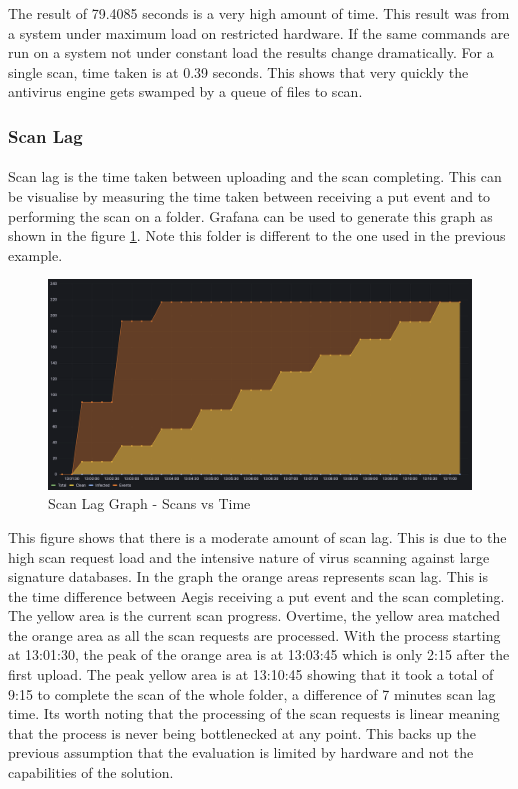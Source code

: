 \documentclass[12pt, conference, final, a4paper, onecolumn, compsoc]{IEEEtran}
\begin{document}
The result of 79.4085 seconds is a very high amount of time. This result was from a system under maximum load on restricted hardware. If the same commands are run on a system not under constant load the results change dramatically. For a single scan, time taken is at 0.39 seconds. This shows that very quickly the antivirus engine gets swamped by a queue of files to scan.

\subsubsection*{Scan Lag}
\paragraph{}
Scan lag is the time taken between uploading and the scan completing. This can
be visualise by measuring the time taken between receiving a put event and to
performing the scan on a folder. Grafana can be used to generate this graph as shown in the
figure \ref{fig:scan-lag}. Note this folder is different to the one used in the
previous example.

\begin{figure}[H]
  \centering \includegraphics[scale=0.31]{images/scan-lag.png}
  \caption{Scan Lag Graph - Scans vs Time}
  \label{fig:scan-lag}
\end{figure}

This figure shows that there is a moderate amount of scan lag. This is due to
the high scan request load and the intensive nature of virus scanning against
large signature databases. In the graph the orange areas represents scan lag.
This is the time difference between Aegis receiving a put event and the scan
completing. The yellow area is the current scan progress. Overtime, the yellow
area matched the orange area as all the scan requests are processed. With the
process starting at 13:01:30, the peak of the orange area is at 13:03:45 which
is only 2:15 after the first upload. The peak yellow area is at 13:10:45 showing
that it took a total of 9:15 to complete the scan of the whole folder, a
difference of 7 minutes scan lag time. Its worth noting that the processing of
the scan requests is linear meaning that the process is never being bottlenecked
at any point. This backs up the previous assumption that the evaluation is
limited by hardware and not the capabilities of the solution.
\end{document}
